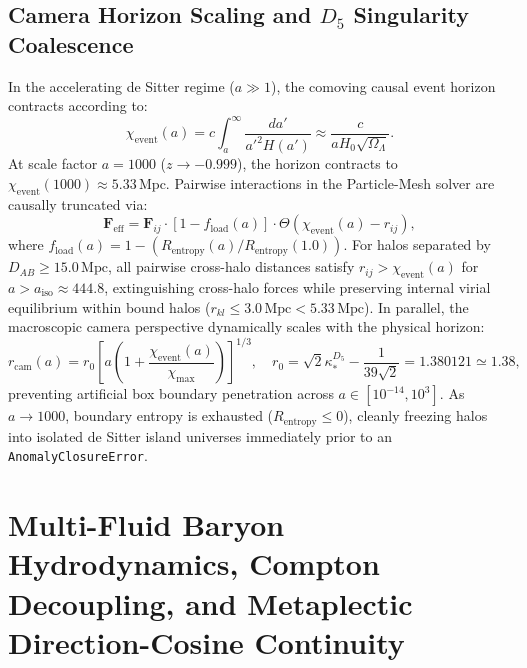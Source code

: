 \documentclass[11pt]{article}
\theoremstyle{plain}
\begin{document}
\subsection{Camera Horizon Scaling and \texorpdfstring{$D_5$}{D5} Singularity Coalescence}
\label{app:camera-horizon-d5-coalescence}
In the accelerating de Sitter regime ($a \gg 1$), the comoving causal event horizon contracts according to:
\begin{equation}
\chi_{\mathrm{event}}(a) = c \int_a^\infty \frac{da'}{a'^2 H(a')} \approx \frac{c}{a H_0 \sqrt{\Omega_\Lambda}}.
\end{equation}
At scale factor $a = 1000$ ($z \to -0.999$), the horizon contracts to $\chi_{\mathrm{event}}(1000) \approx 5.33\,\mathrm{Mpc}$. Pairwise interactions in the Particle-Mesh solver are causally truncated via:
\begin{equation}
\mathbf{F}_{\mathrm{eff}} = \mathbf{F}_{ij} \cdot [1 - f_{\mathrm{load}}(a)] \cdot \Theta\left(\chi_{\mathrm{event}}(a) - r_{ij}\right),
\end{equation}
where $f_{\mathrm{load}}(a) = 1 - (R_{\mathrm{entropy}}(a) / R_{\mathrm{entropy}}(1.0))$. For halos separated by $D_{AB} \ge 15.0\,\mathrm{Mpc}$, all pairwise cross-halo distances satisfy $r_{ij} > \chi_{\mathrm{event}}(a)$ for $a > a_{\mathrm{iso}} \approx 444.8$, extinguishing cross-halo forces while preserving internal virial equilibrium within bound halos ($r_{kl} \le 3.0\,\mathrm{Mpc} < 5.33\,\mathrm{Mpc}$). In parallel, the macroscopic camera perspective dynamically scales with the physical horizon:
\begin{equation}
r_{\mathrm{cam}}(a) = r_0 \left[ a \left(1 + \frac{\chi_{\mathrm{event}}(a)}{\chi_{\mathrm{max}}}\right) \right]^{1/3}, \quad r_0 = \sqrt{2}\kappa_*^{D_5} - \frac{1}{39\sqrt{2}} = 1.380121 \simeq 1.38,
\end{equation}
preventing artificial box boundary penetration across $a \in [10^{-14}, 10^3]$. As $a \to 1000$, boundary entropy is exhausted ($R_{\mathrm{entropy}} \le 0$), cleanly freezing halos into isolated de Sitter island universes immediately prior to an \texttt{AnomalyClosureError}.


\section{Multi-Fluid Baryon Hydrodynamics, Compton Decoupling, and Metaplectic Direction-Cosine Continuity}
\label{sec:metric-kinematics-cardy-virialization}
\label{app:affine-quantization-cardy-freeze}
\end{document}
